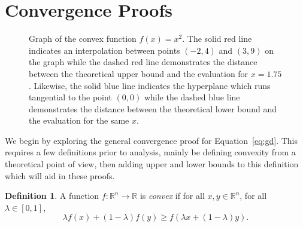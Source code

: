\documentclass{article}
\newcommand{\R}{\mathbb R}
\theoremstyle{definition}
\newtheorem{definition}{Definition}
\begin{document}
\section{Convergence Proofs}

\begin{figure}[t]
    \begin{center}
    \end{center}
    \caption{Graph of the convex function $f(x) = x^2$. The solid red line
    indicates an interpolation between points $(-2, 4)$ and $(3, 9)$ on the
    graph while the dashed red line demonstrates the distance between the
    theoretical upper bound and the evaluation for $x = 1.75$. Likewise, the
    solid blue line indicates the hyperplane which runs tangential to the point
    $(0, 0)$ while the dashed blue line demonstrates the distance between the
    theoretical lower bound and the evaluation for the same $x$.}%
    \label{fig:convex}
\end{figure}

We begin by exploring the general convergence proof for Equation~\ref{eq:gd}.
This requires a few definitions prior to analysis, mainly be defining convexity
from a theoretical point of view, then adding upper and lower bounds to this
definition which will aid in these proofs. 

\begin{definition}
    A function $f: \R^n \rightarrow \R$ is \emph{convex} if for all $x, y \in
    \R^n$, for all $\lambda \in [0, 1]$,
    \begin{equation}
        \lambda f(x) + (1 - \lambda)f(y) \geq f(\lambda x + (1 - \lambda)y).
    \end{equation}
\end{definition}
\end{document}
